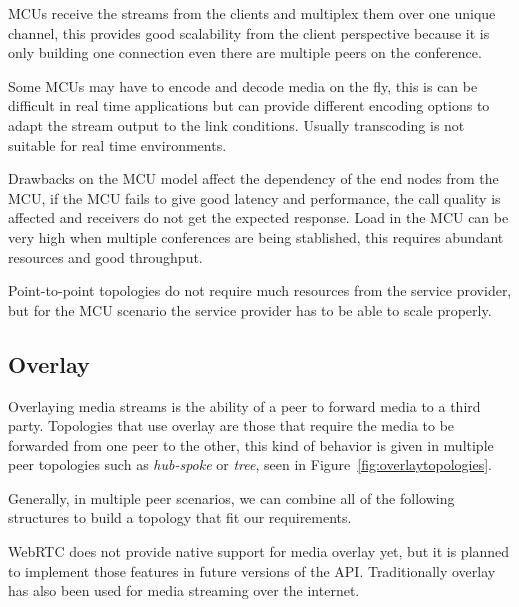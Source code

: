 MCUs receive the streams from the clients and multiplex them over one unique channel, this provides good scalability from the client perspective because it is only building one connection even there are multiple peers on the conference.

Some MCUs may have to encode and decode media on the fly, this is can be difficult in real time applications but can provide different encoding options to adapt the stream output to the link conditions. Usually transcoding is not suitable for real time environments.

Drawbacks on the MCU model affect the dependency of the end nodes from the MCU, if the MCU fails to give good latency and performance, the call quality is affected and receivers do not get the expected response. Load in the MCU can be very high when multiple conferences are being stablished, this requires abundant resources and good throughput.

Point-to-point topologies do not require much resources from the service provider, but for the MCU scenario the service provider has to be able to scale properly.

\subsection{Overlay}

Overlaying media streams is the ability of a peer to forward media to a third party. Topologies that use overlay are those that require the media to be forwarded from one peer to the other, this kind of behavior is given in multiple peer topologies such as {\it hub-spoke} or {\it tree}, seen in Figure~\ref{fig:overlaytopologies}.

Generally, in multiple peer scenarios, we can combine all of the following structures to build a topology that fit our requirements.

WebRTC does not provide native support for media overlay yet, but it is planned to implement those features in future versions of the API. Traditionally overlay has also been used for media streaming over the internet.

